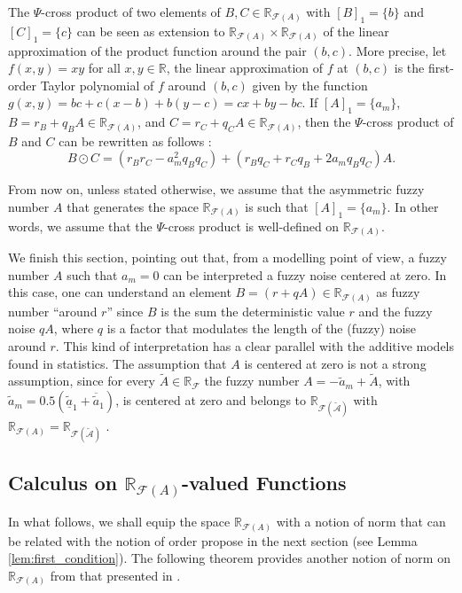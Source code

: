 \documentclass[12pt,a4paper]{article}
\newcommand{\RR}{\mathbb{R}}
\newcommand{\RF}{\mathbb{R}_\mathcal{F}}
\newcommand{\RFA}{\mathbb{R}_{\mathcal{F}(A)}}
\begin{document}
The $\Psi$-cross product of two elements of $B,C \in \RFA$ with $[B]_1 = \{b\}$ and 
$[C]_1 = \{c\}$ can be seen as extension to $\RFA \times \RFA$ of the linear approximation of the product function around the pair $(b,c)$. More precise, let $f(x,y) = xy$ for all $x,y \in \RR$, the linear approximation of $f$ at $(b,c)$ is the first-order Taylor polynomial of $f$ around $(b,c)$ given by the function $g(x,y) = bc + c(x-b) + b(y-c) = cx + by - bc$. 
If $[A]_1 = \{a_m\}$, $B=r_B + q_BA \in \RFA$, and $C=r_C + q_CA \in \RFA$, then 
the $\Psi$-cross product of $B$ and $C$ can be rewritten as follows \cite{longo2022cross}:
\begin{equation}\label{eq:cross_product}
B \odot C = (r_Br_C - a_m^2q_Bq_C) + (r_Bq_C + r_Cq_B + 2a_mq_Bq_C)A. 
\end{equation}

From now on, unless stated otherwise, we assume that the asymmetric fuzzy number $A$ that generates the space $\RFA$ is such that $[A]_1 =\{a_m\}$. In other words, we assume that the $\Psi$-cross product is well-defined on $\RFA$. 

We finish this section, pointing out that, from a modelling point of view, a fuzzy number $A$ such that $a_m = 0$ can be interpreted a fuzzy noise centered at zero. In this case, one can understand an element $B = (r +qA) \in \RFA$ as fuzzy number ``around $r$'' since $B$ is the sum the deterministic value $r$ and the fuzzy noise $qA$, where $q$ is a factor that modulates the length of the (fuzzy) noise around $r$. This kind of interpretation has a clear parallel with the additive models found in statistics.
The assumption that $A$ is centered at zero  
is not a strong assumption, since for every $\tilde{A} \in \RF$ the fuzzy number 
$A = -\tilde{a}_m + \tilde{A}$, with $\tilde{a}_m = 0.5(\underline{\tilde{a}}_1 + \overline{\tilde{a}}_1)$, is centered at zero and belongs to $\mathbb{R}_{\mathcal{F(\tilde{A})}}$ with $\RFA = \mathbb{R}_{\mathcal{F(\tilde{A})}}$ \cite{esmi2018frechet}.

\subsection{Calculus on $\RFA$-valued Functions}

In what follows, we shall equip the space $\RFA$ with a notion of norm that can be related with the notion of order propose in the next section (see Lemma \ref{lem:first_condition}). The following theorem provides another notion of norm on $\RFA$ from that  presented in \cite{esmi2018frechet}. 
\end{document}
